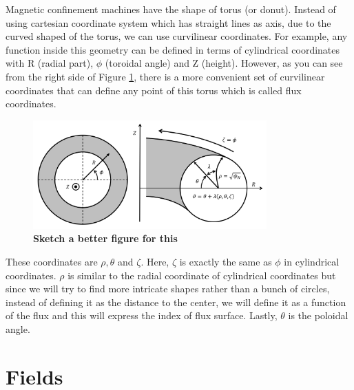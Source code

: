 \documentclass{article}
\begin{document}
Magnetic confinement machines have the shape of torus (or donut). Instead of using cartesian coordinate system which has straight lines as axis, due to the curved shaped of the torus, we can use curvilinear coordinates. For example, any function inside this geometry can be defined in terms of cylindrical coordinates with R (radial part), $\phi$ (toroidal angle) and Z (height). However, as you can see from the right side of Figure \ref{coords}, there is a more convenient set of curvilinear coordinates that can define any point of this torus which is called flux coordinates. 

\begin{figure}[H]
    \centering
    \includegraphics[width=0.8\textwidth]{coords.png}
    \caption{{\color{red}\textbf{Sketch a better figure for this}}}
    \label{coords}
\end{figure}

These coordinates are $\rho, \theta$ and $\zeta$. Here, $\zeta$ is exactly the same as $\phi$ in cylindrical coordinates. $\rho$ is similar to the radial coordinate of cylindrical coordinates but since we will try to find more intricate shapes rather than a bunch of circles, instead of defining it as the distance to the center, we will define it as a function of the flux and this will express the index of flux surface. Lastly, $\theta$ is the poloidal angle. 









\pagebreak
\section{Fields}




\end{document}
